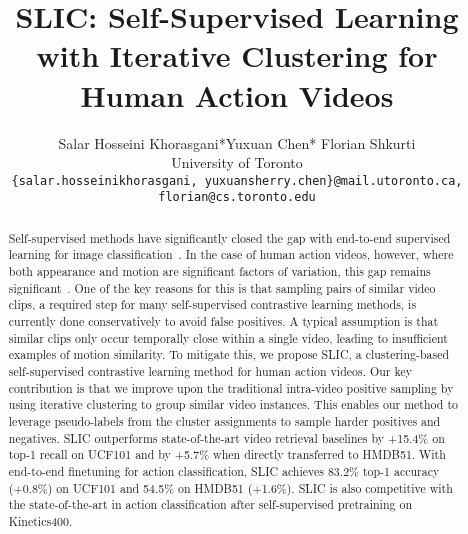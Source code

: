 \documentclass[10pt,twocolumn,letterpaper]{article}
\begin{document}
\title{SLIC: Self-Supervised Learning with Iterative Clustering for Human Action Videos}







\author{Salar Hosseini Khorasgani*\qquad Yuxuan Chen* \qquad Florian Shkurti\\
University of Toronto \\
{\tt \small \{salar.hosseinikhorasgani, yuxuansherry.chen\}@mail.utoronto.ca, florian@cs.toronto.edu}
}










\maketitle

\begin{abstract}


 
Self-supervised methods have significantly closed the gap with end-to-end supervised learning for image classification~\cite{byol, chen2020simple}. In the case of human action videos, however, where both appearance and motion are significant factors of variation, this gap remains significant~\cite{coclr, xie2018rethinking}. One of the key reasons for this is that sampling pairs of similar video clips, a required step for many self-supervised contrastive learning methods, is currently done conservatively to avoid false positives. A typical assumption is that similar clips only occur temporally close within a single video, leading to insufficient examples of motion similarity. To mitigate this, we propose SLIC, a clustering-based self-supervised contrastive learning method for human action videos. Our key contribution is that we improve upon the traditional intra-video positive sampling by using iterative clustering to group similar video instances. This enables our method to leverage pseudo-labels from the cluster assignments to sample harder positives and negatives. SLIC outperforms state-of-the-art video retrieval baselines by +15.4\% on top-1 recall on UCF101 and by +5.7\% when directly transferred to HMDB51. With end-to-end finetuning for action classification, SLIC achieves 83.2\% top-1 accuracy (+0.8\%) on UCF101 and 54.5\% on HMDB51 (+1.6\%). SLIC is also competitive with the state-of-the-art in action classification after self-supervised pretraining on Kinetics400. 

\renewcommand{\thefootnote}{\fnsymbol{footnote}}







 
   





\end{abstract}
\end{document}
